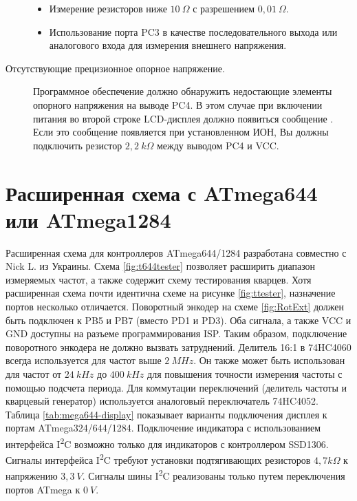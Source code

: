 \begin{description}
\begin{itemize}
 \item Измерение резисторов ниже \(10~\Omega\) с разрешением \(0,01~\Omega\).\\
 \item Использование порта PC3 в качестве последовательного выхода или аналогового входа для измерения внешнего напряжения.\\
\end{itemize}
\item[Отсутствующие прецизионное опорное напряжение.]
Программное обеспечение должно обнаружить недостающие элементы опорного напряжения на выводе PC4. В этом случае при 
		включении питания во второй строке LCD-дисплея должно появиться сообщение . Если это сообщение 
появляется при установленном ИОН, Вы должны подключить резистор \(2,2~k\Omega\) между выводом PC4 и VCC.

\end{description}

\section{Расширенная схема с ATmega644 или ATmega1284}

Расширенная схема для контроллеров ATmega644/1284 разработана совместно с Nick L. из Украины.
Схема \ref{fig:t644tester} позволяет расширить диапазон измеряемых частот, а также содержит схему 
тестирования кварцев. 
Хотя расширенная схема почти идентична схеме на рисунке \ref{fig:ttester}, 
назначение портов несколько отличается.
Поворотный энкодер на схеме \ref{fig:RotExt} должен быть подключен к PB5 и PB7 (вместо PD1 и PD3).
Оба сигнала, а также VCC и GND доступны на разъеме программирования ISP. Таким образом, подключение
поворотного энкодера не должно вызвать затруднений.
Делитель 16:1 в 74HC4060 всегда используется для частот выше \(2~MHz\). 
Он также может быть использован для частот от \(24~kHz\) до \(400~kHz\) для повышения точности
измерения частоты с помощью подсчета периода.
Для коммутации переключений (делитель частоты и кварцевый генератор) используется 
аналоговый переключатель 74HC4052.
Таблица \ref{tab:mega644-display} показывает варианты подключения дисплея к портам 
ATmega324/644/1284.
Подключение индикатора с использованием интерфейса I\textsuperscript{2}C возможно только для индикаторов с 
контроллером SSD1306.
Сигналы интерфейса I\textsuperscript{2}C требуют установки подтягивающих резисторов \(4,7k\Omega\) к напряжению \(3,3~V\).
Сигналы шины I\textsuperscript{2}C реализованы только путем переключения портов ATmega к \(0~V\).


